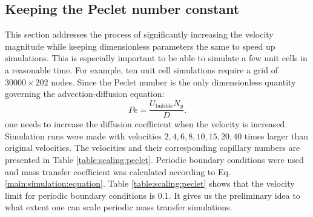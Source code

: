 \documentclass{article}
\newcommand{\beq}{\begin{equation}}
\newcommand{\feq}{\end{equation}}
\newcommand{\ububble}{U_{\mathrm{bubble}}}
\newcommand{\omegaminus}{\omega_{-}}
\begin{document}
\subsection{Keeping the Peclet number constant}
\label{section:keeping:peclet}
This section addresses the process of significantly increasing the
velocity magnitude while keeping dimensionless parameters the same to
speed up                                      
simulations. This is especially important to be able to simulate a few unit cells in a reasonable time.
For example, ten unit cell simulations require a grid of $30000\times202$ nodes.
Since the Peclet number is the only dimensionless quantity governing
the advection-diffusion equation:
\beq
Pe=\frac{\ububble N_y}{D}.
\feq
one needs to increase the diffusion coefficient when the velocity is increased. Simulation runs were made with
velocities $2,4,6,8,10,15,20,40$ times larger than original velocities. The velocities and
their corresponding capillary numbers are presented in Table \ref{table:scaling:peclet}. Periodic
boundary conditions were used and mass transfer coefficient was calculated according to Eq.
\ref{main:simulation:equation}. Table \ref{table:scaling:peclet} shows that the velocity limit
for  periodic boundary conditions is $0.1$. %
It gives us the
preliminary idea to what extent one can scale periodic mass transfer simulations. 
\end{document}
